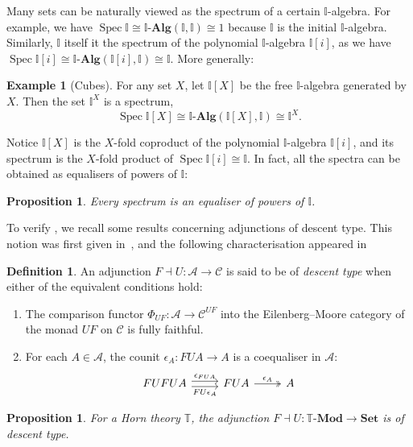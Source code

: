 \documentclass[a4paper,12pt]{amsart}
\newtheorem{proposition}[theorem]{Proposition}
\theoremstyle{definition}
\newtheorem{example}[theorem]{Example}
\newtheorem{definition}[theorem]{Definition}
\newcommand{\mc}[1]{\mathcal{#1}}
\newcommand{\mb}[1]{\mathbf{#1}}
\newcommand{\mbb}[1]{\mathbb{#1}}
\newcommand{\T}{\mbb T}
\newcommand{\I}{\mbb I}
\newcommand{\Set}{\mb{Set}}
\newcommand{\alg}{\text{-}\mb{Alg}}
\newcommand{\mmod}[1]{#1\text{-}\mathbf{Mod}}
\newcommand{\spec}{\operatorname{Spec}}
\begin{document}
Many sets can be naturally viewed as the spectrum of a certain $\I$-algebra. For example, we have $\spec \I \cong \I\alg(\I,\I) \cong 1$ because  $\I$ is the initial $\I$-algebra. Similarly, $\I$ itself it the spectrum of the polynomial $\I$-algebra $\I[i]$, as we have $\spec \I[i] \cong \I\alg(\I[i],\I) \cong \I$. More generally:

\begin{example}[Cubes]\label{exm:cubeaffine}
  For any set $X$, let $\I[X]$ be the free $\I$-algebra generated by $X$. Then the set $\I^X$ is a spectrum,
  \[ \spec \I[X] \cong \I\alg(\I[X],\I) \cong \I^X. \]
\end{example}

Notice $\I[X]$ is the $X$-fold coproduct of the polynomial $\I$-algebra $\I[i]$, and its spectrum is the $X$-fold product of $\spec\I[i] \cong \I$. In fact, all the spectra can be obtained as equalisers of powers of $\I$:

\begin{proposition}\label{prop:spectra-are-powers-of-the-interval}
  Every spectrum is an equaliser of powers of $\I$. 
\end{proposition}

To verify , we recall some results concerning adjunctions of descent type. This notion was first given in~\citet{BarrMichael1985Ttat}, and the following characterisation appeared in~\citet{kelly1993adjunctions}

\begin{definition}
  An adjunction $F\dashv U\colon \mathcal{A}\to \mathcal{C}$ is said to be of \emph{descent type} when either of the equivalent conditions hold:
  \begin{enumerate}
    \item The comparison functor $\Phi_{UF}\colon \mc{A} \to \mc{C}^{UF}$ into the Eilenberg--Moore category of the monad $UF$ on $\mathcal{C}$ is fully faithful.
    \item For each $A\in \mc{A}$, the counit $\epsilon_A\colon FUA\to A$ is a coequaliser in $\mc{A}$:
    \[\begin{tikzcd}
      FUFUA \ar[r, shift left, "\epsilon_{FUA}"] \ar[r, shift right, "{FU\epsilon_A}"'] & FUA \ar[r, two heads, "\epsilon_{A}"] & A
    \end{tikzcd}\]  
  \end{enumerate}
\end{definition}

\begin{proposition}\label{lem:horn-free-models-descent}
  For a Horn theory $\T$, the adjunction $F\dashv U\colon \mmod\T\to\Set$ is of descent type.
\end{proposition}
\end{document}
